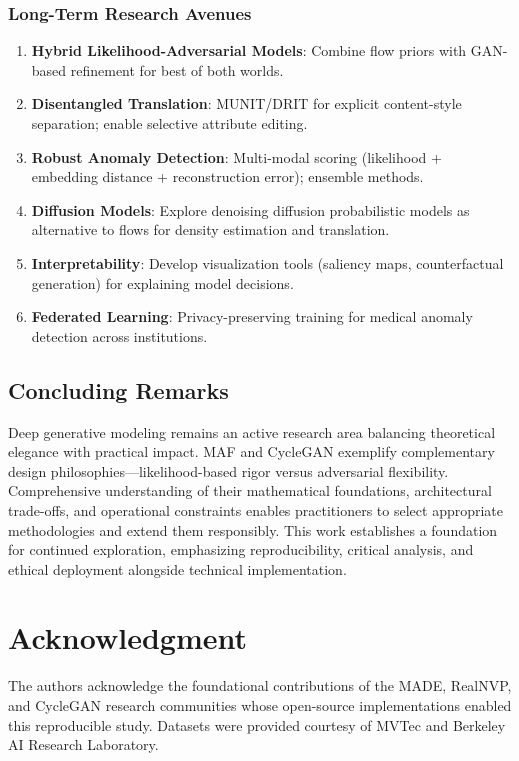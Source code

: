 \documentclass[conference]{IEEEtran}
\begin{document}
\subsubsection{Long-Term Research Avenues}
\begin{enumerate}
\item \textbf{Hybrid Likelihood-Adversarial Models}: Combine flow priors with GAN-based refinement for best of both worlds.
\item \textbf{Disentangled Translation}: MUNIT/DRIT for explicit content-style separation; enable selective attribute editing.
\item \textbf{Robust Anomaly Detection}: Multi-modal scoring (likelihood + embedding distance + reconstruction error); ensemble methods.
\item \textbf{Diffusion Models}: Explore denoising diffusion probabilistic models as alternative to flows for density estimation and translation.
\item \textbf{Interpretability}: Develop visualization tools (saliency maps, counterfactual generation) for explaining model decisions.
\item \textbf{Federated Learning}: Privacy-preserving training for medical anomaly detection across institutions.
\end{enumerate}

\subsection{Concluding Remarks}
Deep generative modeling remains an active research area balancing theoretical elegance with practical impact. MAF and CycleGAN exemplify complementary design philosophies—likelihood-based rigor versus adversarial flexibility. Comprehensive understanding of their mathematical foundations, architectural trade-offs, and operational constraints enables practitioners to select appropriate methodologies and extend them responsibly. This work establishes a foundation for continued exploration, emphasizing reproducibility, critical analysis, and ethical deployment alongside technical implementation.

\section*{Acknowledgment}
The authors acknowledge the foundational contributions of the MADE, RealNVP, and CycleGAN research communities whose open-source implementations enabled this reproducible study. Datasets were provided courtesy of MVTec and Berkeley AI Research Laboratory.
\end{document}
